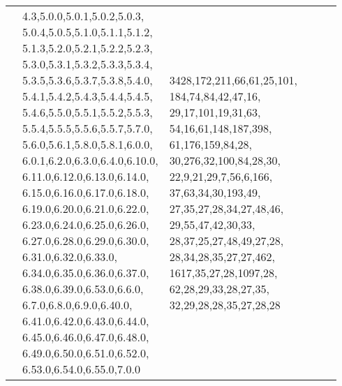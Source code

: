 \begin{table*}[ht!]
\begin{tabular}{ |l|p{90pt}|p{90pt}|p{90pt}|p{70pt}|p{60pt}| }
    & \makecell[l]{4.3,5.0.0,5.0.1,5.0.2,5.0.3,\\5.0.4,5.0.5,5.1.0,5.1.1,5.1.2,\\5.1.3,5.2.0,5.2.1,5.2.2,5.2.3,\\5.3.0,5.3.1,5.3.2,5.3.3,5.3.4,\\5.3.5,5.3.6,5.3.7,5.3.8,5.4.0,\\5.4.1,5.4.2,5.4.3,5.4.4,5.4.5,\\5.4.6,5.5.0,5.5.1,5.5.2,5.5.3,\\5.5.4,5.5.5,5.5.6,5.5.7,5.7.0,\\5.6.0,5.6.1,5.8.0,5.8.1,6.0.0,\\6.0.1,6.2.0,6.3.0,6.4.0,6.10.0,\\6.11.0,6.12.0,6.13.0,6.14.0,\\6.15.0,6.16.0,6.17.0,6.18.0,\\6.19.0,6.20.0,6.21.0,6.22.0,\\6.23.0,6.24.0,6.25.0,6.26.0,\\6.27.0,6.28.0,6.29.0,6.30.0,\\6.31.0,6.32.0,6.33.0,\\6.34.0,6.35.0,6.36.0,6.37.0,\\6.38.0,6.39.0,6.53.0,6.6.0,\\6.7.0,6.8.0,6.9.0,6.40.0,\\6.41.0,6.42.0,6.43.0,6.44.0,\\6.45.0,6.46.0,6.47.0,6.48.0,\\6.49.0,6.50.0,6.51.0,6.52.0,\\6.53.0,6.54.0,6.55.0,7.0.0}
    & \makecell[l]{3428,172,211,66,61,25,101,\\184,74,84,42,47,16,\\29,17,101,19,31,63,\\54,16,61,148,187,398,\\61,176,159,84,28,\\30,276,32,100,84,28,30,\\22,9,21,29,7,56,6,166,\\37,63,34,30,193,49,\\27,35,27,28,34,27,48,46,\\29,55,47,42,30,33,\\28,37,25,27,48,49,27,28,\\28,34,28,35,27,27,462,\\1617,35,27,28,1097,28,\\62,28,29,33,28,27,35,\\32,29,28,28,35,27,28,28}

\end{tabular}
\end{table*}
